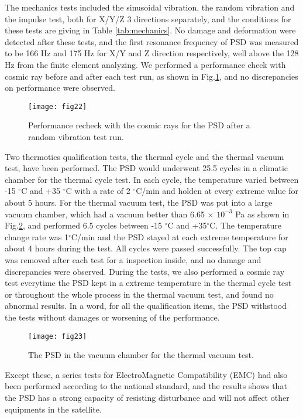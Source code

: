 \documentclass[preprint]{elsarticle}
\begin{document}
The mechanics tests included the sinusoidal vibration, the random vibration and the impulse test, both for X/Y/Z 3 directions separately, and the conditions for these tests are giving in Table \ref{tab:mechanics}. No damage and deformation were detected after these tests, and the first resonance frequency of PSD was measured to be 166 Hz and 175 Hz for X/Y and Z direction respectively, well above the 128 Hz from the finite element analyzing.
We performed a performance check with cosmic ray before and after each test run, as shown in Fig.\ref{fig:fig22}, and no discrepancies on performance were observed.



\begin{figure}
 \centering
 \texttt{[image: fig22]}
\caption{Performance recheck with the cosmic rays for the PSD after a random vibration test run.}
\label{fig:fig22}
\end{figure}

Two thermotics qualification tests, the thermal cycle and the thermal vacuum test, have been performed. The PSD would underwent 25.5 cycles in a climatic chamber for the thermal cycle test. In each cycle, the temperature varied between -15 $^{\circ}$C and +35 $^{\circ}$C with a rate of 2 $^{\circ}$C/min and holden at every extreme value for about 5 hours. For the thermal vacuum test, the PSD was put into a large vacuum chamber, which had a vacuum better than 6.65 $\times$ $10^{-3}$ Pa as shown in Fig.\ref{fig:fig23}, and performed 6.5 cycles between -15 $^{\circ}$C and +35$^{\circ}$C. The temperature change rate was 1$^{\circ}$C/min and the PSD stayed at each extreme temperature for about 4 hours during the test. All cycles were passed successfully. The top cap was removed after each test for a inspection inside, and no damage and discrepancies were observed. During the tests, we also performed a cosmic ray test everytime the PSD kept in a extreme temperature in the thermal cycle test or throughout the whole process in the thermal vacuum test, and found no abnormal results. In a word, for all the qualification items, the PSD withstood the tests without damages or worsening of the performance.

\begin{figure}
 \centering
 \texttt{[image: fig23]}
\caption{The PSD in the vacuum chamber for the thermal vacuum test.}
\label{fig:fig23}
\end{figure}

Except these, a series tests for ElectroMagnetic Compatibility (EMC) had also been performed according to the national standard, and the results shows that the PSD has a strong capacity of resisting disturbance and will not affect other equipments in the satellite.
\end{document}

